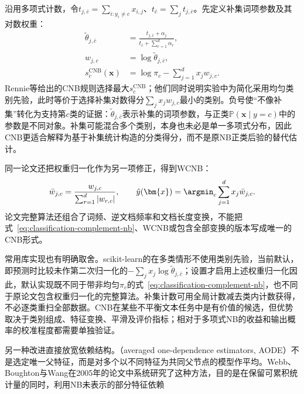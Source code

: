 沿用多项式计数，令$t_{j,\bar c}=\sum_{i:y_i\neq c}x_{i,j}$、$t_{\bar c}=\sum_jt_{j,\bar c}$。先定义补集词项参数及其对数权重：
\begin{equation}
  \label{eq:classification-complement-nb}
  \begin{aligned}
    \tilde\theta_{j,\bar c}
      &=\frac{t_{j,\bar c}+\alpha_j}
              {t_{\bar c}+\sum_{r=1}^{d}\alpha_r},\\
    w_{j,c}&=\log\tilde\theta_{j,\bar c},\\
    s_c^{\mathrm{CNB}}(\bm{x})
      &=\log\pi_c-\sum_{j=1}^{d}x_jw_{j,c}.
  \end{aligned}
\end{equation}
Rennie等给出的CNB规则选择最大$s_c^{\mathrm{CNB}}$；他们同时说明实验中为简化采用均匀类别先验，此时等价于选择补集对数得分$\sum_jx_jw_{j,c}$最小的类别。负号使“不像补集”转化为支持第$c$类的证据：$\tilde\theta_{j,\bar c}$表示补集的词项参数，与正类$\mathbb{P}(\bm{x}\mid y=c)$中的参数是不同对象。补集可能混合多个类别，本身也未必是单一多项式分布，因此CNB更适合解释为基于补集统计构造的分类得分，而不是原NB正类后验的替代估计。

同一论文还把权重归一化作为另一项修正，得到WCNB：
\[
  \bar w_{j,c}
  =\frac{w_{j,c}}{\sum_{r=1}^{d}|w_{r,c}|},
  \qquad
  \hat y(\bm{x})
  =\argmin_c\sum_{j=1}^{d}x_j\bar w_{j,c}.
\]
论文完整算法还组合了词频、逆文档频率和文档长度变换，不能把式~\eqref{eq:classification-complement-nb}、WCNB或包含全部变换的版本写成唯一的CNB形式。

常用库实现也有明确取舍。scikit-learn的在多类情形不使用类别先验，当前默认，即预测时比较未作第二次归一化的$-\sum_jx_j\log\tilde\theta_{j,\bar c}$；设置才启用上述权重归一化因此，默认实现既不同于带非均匀$\pi_c$的式~\eqref{eq:classification-complement-nb}，也不同于原论文包含权重归一化的完整算法。补集计数可用全局计数减去类内计数获得，不必逐类重扫全部数据。CNB在某些不平衡文本任务中是有价值的候选，但优势取决于类别组成、特征变换、平滑及评价指标；相对于多项式NB的收益和输出概率的校准程度都需要单独验证。

另一种改进直接放宽依赖结构。（averaged one-dependence estimators, AODE）不是选定唯一父特征，而是对多个以不同特征为共同父节点的模型作平均。Webb、Boughton与Wang在2005年的论文中系统研究了这种方法，目的是在保留可累积统计量的同时，利用NB未表示的部分特征依赖

